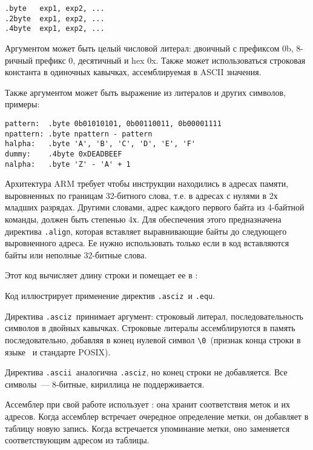 \begin{verbatim}
.byte   exp1, exp2, ...
.2byte  exp1, exp2, ...
.4byte  exp1, exp2, ...
\end{verbatim}

Аргументом может быть целый числовой литерал: двоичный с префиксом 0b, 8-ричный
префикс 0, десятичный и hex 0x. Также может использоваться строковая константа в
одиночных кавычках, ассемблируемая в ASCII значения.

Также аргументом может быть \ci\-выражение из литералов и других символов,
примеры:

\begin{verbatim}
pattern:  .byte 0b01010101, 0b00110011, 0b00001111
npattern: .byte npattern - pattern
halpha:   .byte 'A', 'B', 'C', 'D', 'E', 'F'
dummy:    .4byte 0xDEADBEEF
nalpha:   .byte 'Z' - 'A' + 1
\end{verbatim}


Архитектура ARM требует чтобы инструкции находились в адресах памяти,
выровненных по границам 32-битного слова, т.е. в адресах с нулями в 2х младших
разрядах. Другими словами, адрес каждого первого байта из 4-байтной команды,
должен быть степенью 4х. Для обеспечения этого предназначена директива
\verb|.align|, которая вставляет выравнивающие байты до следующего выровненного
адреса. Ее нужно использовать только если в код вставляются байты или неполные
32-битные слова.

\secup

\secdown

Этот код вычисляет длину строки и помещает ее в :


Код иллюстрирует применение директив \verb|.asciz|\ и \verb|.equ|.


Директива \verb|.asciz|\ принимает аргумент: строковый литерал,
последовательность символов в двойных кавычках. Строковые литералы
ассемблируются в память последовательно, добавляя в конец нулевой символ
\verb|\0|\ (признак конца строки в языке \ci\ и стандарте POSIX).

Директива \verb|.ascii|\ аналогична \verb|.asciz|, но конец строки не
добавляется. Все символы\ --- 8-битные, кириллица не поддерживается.


Ассемблер при свой работе использует : она хранит соответствия меток и их адресов. Когда ассемблер встречает
очередное определение метки, он добавляет в таблицу новую запись. Когда
встречается упоминание метки, оно заменяется соответствующим адресом из
таблицы.

